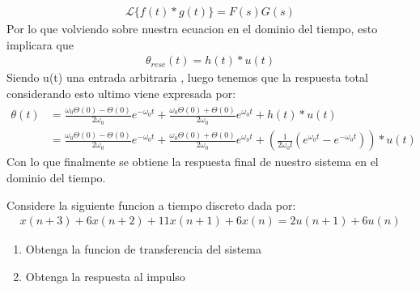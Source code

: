 \documentclass[
  11pt,
  letterpaper,
   addpoints,
   answers
  ]{exam}
\begin{document}
\begin{questions}
\begin{solution}
    \begin{align}
    \mathcal{L}{\{f(t)*g(t)\}} = F(s)G(s)
    \end{align}
    Por lo que volviendo sobre nuestra ecuacion en el dominio del tiempo, esto implicara que 
    \begin{align}
        \theta_{resc}(t) = h(t)*u(t) 
    \end{align}
    Siendo u(t) una entrada arbitraria , luego tenemos que la respuesta total considerando esto ultimo viene expresada por:
    \begin{align}
        \theta(t) &= \frac{\omega_{0}\Theta(0)- \dot{\Theta(0)}}{2\omega_{0}}e^{-\omega_{0}t} + \frac{\omega_{0}\Theta(0)+ \dot{\Theta(0)}}{2\omega_{0}}e^{\omega_{0}t} + h(t)*u(t)\\
        &=\frac{\omega_{0}\Theta(0)- \dot{\Theta(0)}}{2\omega_{0}}e^{-\omega_{0}t} + \frac{\omega_{0}\Theta(0)+ \dot{\Theta(0)}}{2\omega_{0}}e^{\omega_{0}t} + \left( \frac{1}{2\omega_{0}l}(e^{\omega_{0}t} - e^{-\omega_{0}t})\right) * u(t)
    \end{align}
    Con lo que finalmente se obtiene la respuesta final de nuestro sistema en el dominio del tiempo.
    \end{solution}
    \question Considere la siguiente funcion a tiempo discreto dada por:
    \begin{align}
        x(n+3) + 6x(n+2) + 11x(n+1) + 6x(n) = 2u(n+1) + 6u(n) 
    \end{align}
    \begin{enumerate}
        \item Obtenga la funcion de transferencia del sistema 
        \item Obtenga la respuesta al impulso 
    \end{enumerate}
    \begin{solution}

\end{solution}
\end{questions}
\end{document}
